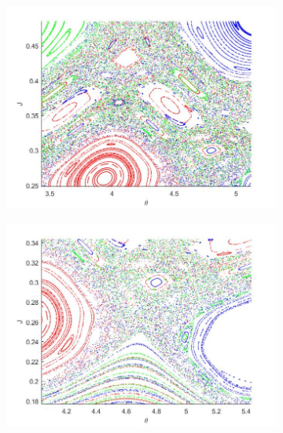 \begin{figure}[H]
	\centering
	\begin{subfigure}{.32\textwidth}
  		\centering
  		\includegraphics[scale=0.25]{Hamiltonian_1/numerical/figs/Q5_1e-2.1e-2_3634_zoom1}
  		\caption{}
  		\label{fig2.9a}
	\end{subfigure}%
	\begin{subfigure}{.32\textwidth}
  		\centering
  		\includegraphics[scale=0.25]{Hamiltonian_1/numerical/figs/Q5_1e-2.1e-2_3634_zoom2}
  		\caption{}
  		\label{fig2.9b}
	\end{subfigure}
	\begin{subfigure}{.32\textwidth}

\end{subfigure}
\end{figure}
